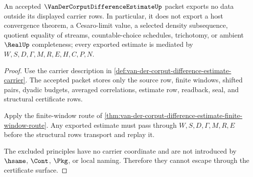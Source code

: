 \begin{theorem}
\label{thm:van-der-corput-difference-estimate-nonescape}
An accepted $\VanDerCorputDifferenceEstimateUp$ packet exports no data outside its displayed carrier rows. In particular, it does not export a host convergence theorem, a Cesaro-limit value, a selected density subsequence, quotient equality of streams, countable-choice schedules, trichotomy, or ambient $\RealUp$ completeness; every exported estimate is mediated by $W,S,D,\Gamma,M,R,E,H,C,P,N$.
\end{theorem}
\begin{proof}
Use the carrier description in \autoref{def:van-der-corput-difference-estimate-carrier}. The accepted packet stores only the source row, finite windows, shifted pairs, dyadic budgets, averaged correlations, estimate row, readback, seal, and structural certificate rows.

Apply the finite-window route of \autoref{thm:van-der-corput-difference-estimate-finite-window-route}. Any exported estimate must pass through $W,S,D,\Gamma,M,R,E$ before the structural rows transport and replay it.

The excluded principles have no carrier coordinate and are not introduced by $\hsame$, $\Cont$, $\Pkg$, or local naming. Therefore they cannot escape through the certificate surface.
\end{proof}




